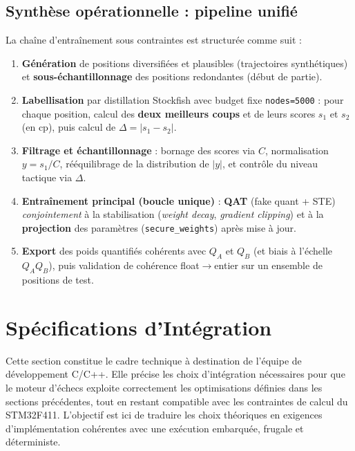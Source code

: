 \documentclass[11pt, a4paper]{article}
\begin{document}
\subsection{Synthèse opérationnelle : pipeline unifié}
La chaîne d'entraînement sous contraintes est structurée comme suit :
\begin{enumerate}
    \item \textbf{Génération} de positions diversifiées et plausibles (trajectoires synthétiques) et \textbf{sous-échantillonnage} des positions redondantes (début de partie).
    \item \textbf{Labellisation} par distillation Stockfish avec budget fixe \texttt{nodes=5000} : pour chaque position, calcul des \textbf{deux meilleurs coups} et de leurs scores $s_1$ et $s_2$ (en cp), puis calcul de $\Delta = |s_1 - s_2|$.
    \item \textbf{Filtrage et échantillonnage} : bornage des scores via $C$, normalisation $y=s_1/C$, rééquilibrage de la distribution de $|y|$, et contrôle du niveau tactique via $\Delta$.
    \item \textbf{Entraînement principal (boucle unique)} : \textbf{QAT} (fake quant + STE) \emph{conjointement} à la stabilisation (\textit{weight decay}, \textit{gradient clipping}) et à la \textbf{projection} des paramètres (\texttt{secure\_weights}) après mise à jour.
    \item \textbf{Export} des poids quantifiés cohérents avec $Q_A$ et $Q_B$ (et biais à l'échelle $Q_A Q_B$), puis validation de cohérence float$\rightarrow$entier sur un ensemble de positions de test.
\end{enumerate}


\section{Spécifications d'Intégration}

\begingroup
\setlength{\parskip}{0.75em}
\setlength{\parindent}{0pt}

Cette section constitue le cadre technique à destination de l'équipe de développement C/C++. Elle précise les choix d'intégration nécessaires pour que le moteur d'échecs exploite correctement les optimisations définies dans les sections précédentes, tout en restant compatible avec les contraintes de calcul du STM32F411. L'objectif est ici de traduire les choix théoriques en exigences d'implémentation cohérentes avec une exécution embarquée, frugale et déterministe.
\end{document}

